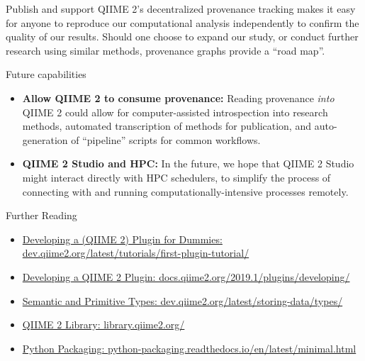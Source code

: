 \documentclass[final]{beamer}
\newlength{\colwidth}
\begin{document}
\begin{frame}[t]
\begin{columns}[t]
\begin{column}{\colwidth}
\begin{block}{Publish and support}
    QIIME 2’s decentralized provenance tracking makes it easy for anyone to reproduce our
    computational analysis independently to confirm the quality of our results.
    Should one choose to expand our study, or conduct further research using
    similar methods, provenance graphs provide a “road map”.

  \end{block}

  \begin{block}{Future capabilities}

    \begin{itemize}
      \item \textbf{Allow QIIME 2 to consume provenance:} Reading
      provenance \textit{into} QIIME 2 could allow for computer-assisted
      introspection into research methods, automated transcription of methods
      for publication, and auto-generation of “pipeline” scripts for common workflows.
      \item \textbf{QIIME 2 Studio and HPC:} In the future, we hope that QIIME 2 Studio might interact
      directly with HPC schedulers, to simplify the process of connecting with
      and running computationally-intensive processes remotely.
    \end{itemize}

  \end{block}

  \begin{block}{Further Reading}
    \begin{itemize}
      \item \href{https://dev.qiime2.org/latest/tutorials/first-plugin-tutorial/}{Developing a (QIIME 2) Plugin for Dummies: dev.qiime2.org/latest/tutorials/first-plugin-tutorial/}
      \item \href{https://docs.qiime2.org/2019.1/plugins/developing/}{Developing a QIIME 2 Plugin: docs.qiime2.org/2019.1/plugins/developing/}
      \item \href{https://dev.qiime2.org/latest/storing-data/types/}{Semantic and Primitive Types: dev.qiime2.org/latest/storing-data/types/}
      \item \href{https://library.qiime2.org/}{QIIME 2 Library: library.qiime2.org/}
      \item \href{https://python-packaging.readthedocs.io/en/latest/minimal.html}{Python Packaging: python-packaging.readthedocs.io/en/latest/minimal.html}
    \end{itemize}
  \end{block}


\end{column}
\end{columns}
\end{frame}
\end{document}
